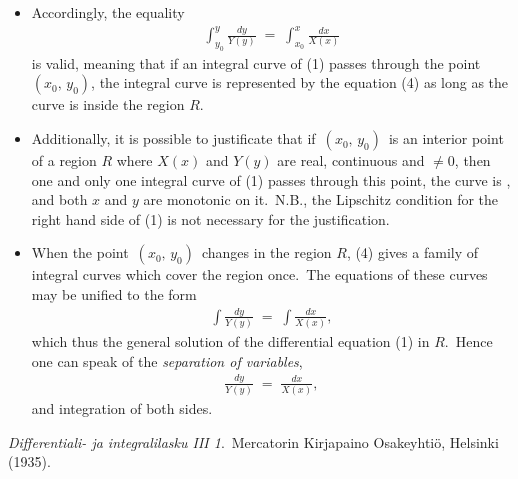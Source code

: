 \documentclass[12pt]{article}
\theoremstyle{definition}
\begin{document}
\begin{itemize}

\item Accordingly, the equality
\begin{align}
\int_{y_0}^y\frac{dy}{Y(y)} \;=\; \int_{x_0}^x\frac{dx}{X(x)}
\end{align}
is valid, meaning that if an integral curve of (1) passes through the point \,$(x_0,\,y_0)$, the integral curve is represented by the equation (4) as long as the curve is inside the region $R$.\\

\item Additionally, it is possible to justificate that if\, $(x_0,\,y_0)$\, is an interior point of a region $R$ where $X(x)$ and $Y(y)$ are real, continuous and $\neq 0$, then one and only one integral curve of (1) passes through this point, the curve is , and both $x$ and $y$ are monotonic on it.\, N.B., the Lipschitz condition for the right hand side of (1) is not necessary for the justification.

\item When the point\, $(x_0,\,y_0)$\, changes in the region $R$, (4) gives a family of integral curves which cover the region once.\, The equations of these curves may be unified to the form 
\begin{align}
\int\frac{dy}{Y(y)} \;=\; \int\frac{dx}{X(x)},
\end{align}
which thus  the general solution of the differential equation (1) in $R$.\, Hence one can speak of the {\em separation of variables},
\begin{align}
\frac{dy}{Y(y)} \;=\; \frac{dx}{X(x)},
\end{align}
and integration of both sides.

\end{itemize}

\begin{thebibliography}{9}
 {\em Differentiali- ja integralilasku III 1}.\, Mercatorin Kirjapaino Osakeyhti\"o, Helsinki (1935).
\end{thebibliography}

\end{document}
